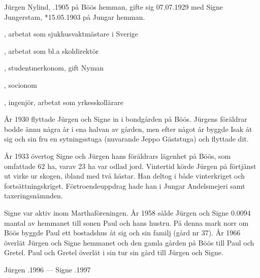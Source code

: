 Jürgen Nylind, .1905 på Böös hemman, gifte sig 07.07.1929 med Signe Jungerstam, *15.05.1903 på Jungar hemman.
\begin{jhchildren}
  \item {}
  \item {}, arbetat som sjukhusvaktmästare i Sverige
  \item {}, arbetat som bl.a skoldirektör
  \item {}, studentmerkonom, gift Nyman
  \item {}, socionom
  \item {}, ingenjör, arbetat som yrkesskollärare
\end{jhchildren}
År 1930 flyttade Jürgen och Signe in i bondgården på Böös. Jürgens föräldrar bodde ännu några år i ena halvan av gården, men efter något år byggde Isak åt sig och sin fru en sytningsstuga (nuvarande Jeppo Gäststuga) och flyttade dit.

År 1933 övertog Signe och Jürgen hans föräldrars lägenhet på Böös, som omfattade 62 ha, varav 23 ha var odlad jord. Vintertid körde Jürgen på förtjänst ut virke ur skogen, ibland med två hästar. Han deltog i både vinterkriget och fortsättningskriget. Förtroendeuppdrag hade han i Jungar Andelsmejeri samt taxeringsnämnden.

Signe var aktiv inom Marthaföreningen. År 1958 sålde Jürgen och Signe 0.0094 mantal av hemmanet till sonen Paul och hans hustru. På denna mark norr om Böös byggde Paul  ett bostadshus åt sig och sin familj (gård nr 37). År 1966 överlät Jürgen och Signe hemmanet och den gamla gården på Böös till Paul och Gretel. Paul och Gretel  överlät i sin tur sin gård till Jürgen och Signe.

Jürgen .1996  ---  Signe .1997


